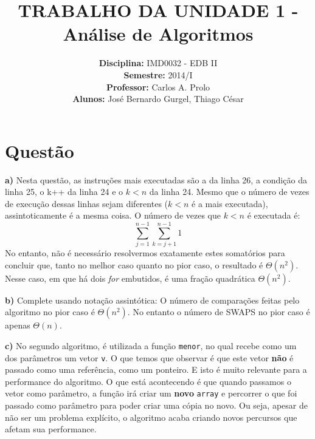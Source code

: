 \documentclass[a4paper,12pt]{article}
\title{TRABALHO DA UNIDADE 1 - Análise de Algoritmos}
\author{
\textbf{Disciplina:} IMD0032 - EDB II
\\\textbf{Semestre:} 2014/I
\\\textbf{Professor:} Carlos A. Prolo
\\\textbf{Alunos:} José Bernardo Gurgel, Thiago César
}
\date{} %
\begin{document}
	
\maketitle
\section{Questão}
\begin{description}
    \item{\textbf{a)}} Nesta questão, as instruções mais executadas são a da linha 26, a condição da linha 25, o k++ da linha 24 e o $k < n$ da linha 24. Mesmo que o número de vezes de execução dessas linhas sejam diferentes ($k < n$ é a mais executada), assintoticamente é a mesma coisa. O número de vezes que $k < n$ é executada é:
	$$
	\sum_{j=1}^{n-1} \sum_{k=j+1}^{n-1} 1
	$$
No entanto, não é necessário resolvermos exatamente estes somatórios para concluir que, tanto no melhor caso quanto no pior caso, o resultado é $\Theta(n^2)$. Nesse caso, em que há dois \textit{for} embutidos, é uma fração quadrática $\Theta(n^2)$.

	\item{\textbf{b)}} Complete usando notação assintótica: O número de comparações feitas pelo algoritmo no pior caso é \underline{$\Theta(n^2)$}. No entanto o número de SWAPS no pior caso é apenas \underline{$\Theta(n)$}.
	
	\item{\textbf{c)}} No segundo algoritmo, é utilizada a função \texttt{menor}, no qual recebe como um dos parâmetros um vetor \texttt{v}. O que temos que observar é que este vetor \textbf{não} é passado como uma referência, como um ponteiro. E isto é muito relevante para a performance do algoritmo. O que está acontecendo é que quando passamos o vetor como parâmetro, a função irá criar um \textbf{novo} \texttt{array} e percorrer o que foi passado como parâmetro para poder criar uma cópia no novo. Ou seja, apesar de não ser um problema explícito, o algoritmo acaba criando novos percursos que afetam sua performance.
\end{description}

\end{document}
